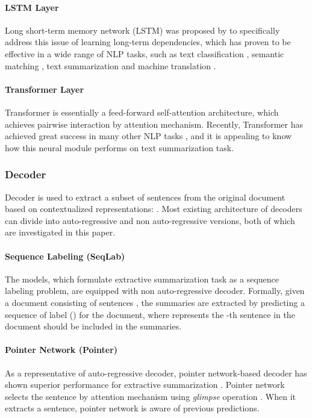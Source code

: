 \documentclass[11pt,a4paper]{article}
\begin{document}
\paragraph{LSTM Layer}
Long short-term memory network (LSTM) was proposed by \cite{hochreiter1997long} to specifically address this issue of learning long-term dependencies, which has proven to be effective in a wide range of NLP tasks, such as text classification \cite{liu2017adversarial,liu2016recurrent}, semantic matching \cite{rocktaschel2015reasoning,liu2016deep}, text summarization \cite{rush2015neural} and machine translation \cite{sutskever2014sequence}.





\paragraph{Transformer Layer}

Transformer \cite{vaswani2017attention} is essentially a feed-forward self-attention architecture, which achieves pairwise interaction by attention mechanism.
Recently, Transformer has achieved great success in many other NLP tasks \cite{vaswani2017attention,dai2018transformer}, and it is appealing to know how this neural module performs on text summarization task.



\subsubsection{Decoder}
Decoder is used to extract a subset of sentences from the original document based on contextualized representations: . Most existing architecture of decoders can divide into auto-regressive and non auto-regressive versions, both of which are investigated in this paper.


\paragraph{Sequence Labeling (SeqLab)}
The models, which formulate extractive summarization task as a sequence labeling problem, are equipped with non auto-regressive decoder.
Formally, given a document  consisting of  sentences , the summaries are extracted by predicting a sequence of label  () for the document, where  represents the -th sentence in the document should be included in the summaries.


\paragraph{Pointer Network (Pointer)}
As a representative of auto-regressive decoder, pointer network-based decoder has shown superior performance for extractive summarization \cite{chen2018fast, jadhav2018extractive}. Pointer network selects the sentence by attention mechanism using  \textit{glimpse} operation \cite{vinyals2015order}. When it extracts a sentence, pointer network is aware of previous predictions.
\end{document}
